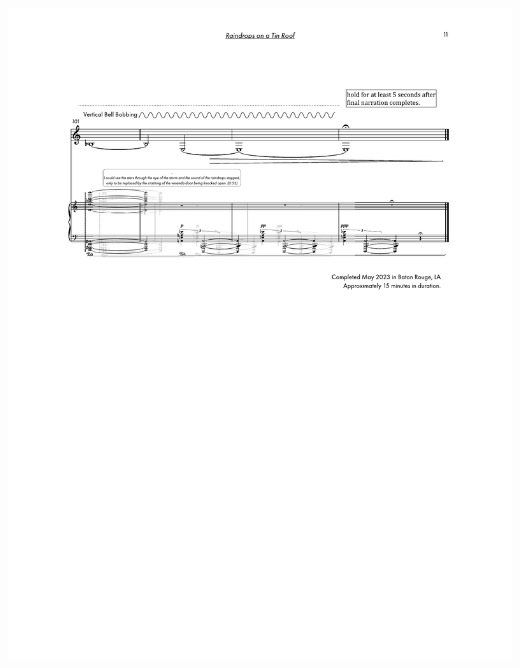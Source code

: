 \begin{center}
     \includegraphics[scale=0.75]{Scores/raindrops_Part17.pdf}
\end{center}
\newpage
